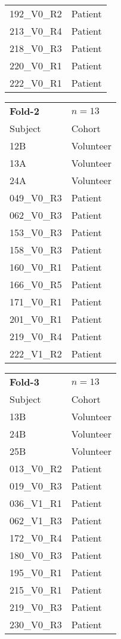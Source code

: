 \begin{table}[htbp]
\begin{tabular}{p{3cm}l}
      192\_V0\_R2 & Patient   \\
      213\_V0\_R4 & Patient   \\
      218\_V0\_R3 & Patient   \\
      220\_V0\_R1 & Patient   \\
      222\_V0\_R1 & Patient   \\      
      \bottomrule
   \end{tabular}
   \begin{tabular}{p{3cm}l}
      \textbf{Fold-2} & $n = 13$ \\
      Subject & Cohort \\
      \midrule
      12B           & Volunteer \\
      13A           & Volunteer \\
      24A           & Volunteer \\
      049\_V0\_R3  & Patient   \\
      062\_V0\_R3  & Patient   \\
      153\_V0\_R3 & Patient   \\
      158\_V0\_R3 & Patient   \\
      160\_V0\_R1 & Patient   \\
      166\_V0\_R5 & Patient   \\
      171\_V0\_R1 & Patient   \\
      201\_V0\_R1 & Patient   \\
      219\_V0\_R4 & Patient   \\
      222\_V1\_R2 & Patient   \\      
      \bottomrule
   \end{tabular}
   \begin{tabular}{p{3cm}l}
      \textbf{Fold-3} & $n = 13$ \\
      Subject & Cohort \\
      \midrule
      13B           & Volunteer \\
      24B           & Volunteer \\
      25B           & Volunteer \\
      013\_V0\_R2  & Patient   \\
      019\_V0\_R3  & Patient   \\
      036\_V1\_R1  & Patient   \\
      062\_V1\_R3  & Patient   \\
      172\_V0\_R4 & Patient   \\
      180\_V0\_R3 & Patient   \\
      195\_V0\_R1 & Patient   \\      
      215\_V0\_R1 & Patient   \\
      219\_V0\_R3 & Patient   \\
      230\_V0\_R3 & Patient   \\      
      \bottomrule
   \end{tabular}
   \label{tab:fold_assignment}
\end{table}

